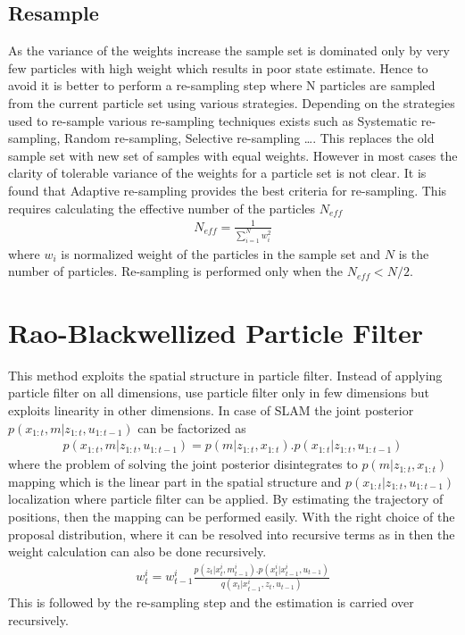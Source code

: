 \subsection{Resample}
As the variance of the weights increase the sample set is dominated only by very few particles with high weight which results in poor state estimate. Hence to avoid it is better to perform a re-sampling step where N particles are sampled from the current particle set using various strategies. Depending on the strategies used to re-sample various re-sampling techniques exists such as Systematic re-sampling, Random re-sampling, Selective re-sampling \dots. This replaces the old sample set with new set of samples with equal weights. However in most cases the clarity of tolerable variance of the weights for a particle set is not clear. It is found that Adaptive re-sampling provides the best criteria for re-sampling. This requires calculating the effective number of the particles ${N_{eff}}$
\begin{gather} \label{Neff}
N_{eff} = \frac{1}{\sum_{i=1}^{N} w_{i}^{2} } 
\end{gather}
where ${w_{i}}$ is normalized weight of the particles in the sample set and ${N}$ is the number of particles.  Re-sampling is performed only 
when the ${N_{eff} < N/2}$.
\section{Rao-Blackwellized Particle Filter}
 This method exploits the spatial structure in particle filter. Instead of applying particle filter on all dimensions, use particle filter only in few dimensions but exploits linearity in other dimensions. In case of SLAM the joint posterior $p(x_{1:t}, m | z_{1:t}, u_{1:t-1})$ can be factorized as 
\begin{gather} \label{RAoB}
    p(x_{1:t}, m | z_{1:t}, u_{1:t-1}) = p(m | z_{1:t}, x_{1:t}).p(x_{1:t} | z_{1:t}, u_{1:t-1})
\end{gather}
where the problem of solving the joint posterior disintegrates to $p(m | z_{1:t}, x_{1:t})$ mapping which is the linear part in the spatial structure and $p(x_{1:t} | z_{1:t}, u_{1:t-1})$ localization where particle filter can be applied. By estimating the trajectory of positions, then the mapping can be performed easily. With the right choice of the proposal distribution, where it can be resolved into recursive terms as in  then the weight calculation can also be done recursively.
\begin{gather} \label{RaoB_weight}
    w_{t}^{i} = w_{t-1}^{i} \frac{p(z_{t}|x_{t}^{i}, m_{t-1}^{i}). p(x_{t}^{i}|x_{t-1}^{i}, u_{t-1})}{q(x_t|x_{t-1}^{i},z_{t}, u_{t-1})}
\end{gather}
This is followed by the re-sampling step and the estimation is carried over recursively.
